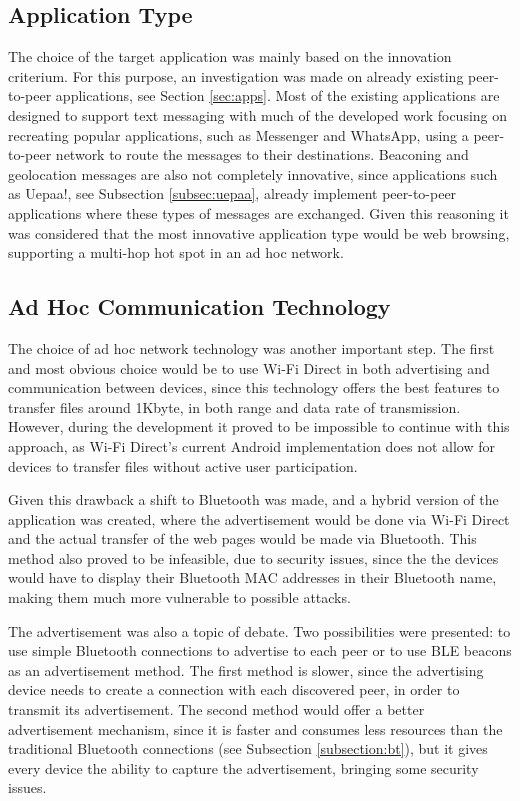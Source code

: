 \subsection{Application Type}

The choice of the target application was mainly based on the innovation criterium. For this purpose, an investigation was made on already existing peer-to-peer applications, see Section \ref{sec:apps}. Most of the existing applications are designed to support text messaging with much of the developed work focusing on recreating popular applications, such as Messenger and WhatsApp, using a peer-to-peer network to route the messages to their destinations. Beaconing and geolocation messages are also not completely innovative, since applications such as Uepaa!, see Subsection \ref{subsec:uepaa}, already implement peer-to-peer applications where these types of messages are exchanged. Given this reasoning it was considered that the most innovative application type would be web browsing, supporting a multi-hop hot spot in an ad hoc network.

\subsection{Ad Hoc Communication Technology}

The choice of ad hoc network technology was another important step. The first and most obvious choice would be to use Wi-Fi Direct in both advertising and communication between devices, since this technology offers the best features to transfer files around 1Kbyte, in both range and data rate of transmission. However, during the development it proved to be impossible to continue with this approach, as Wi-Fi Direct's current Android implementation does not allow for devices to transfer files without active user participation.

Given this drawback a shift to Bluetooth was made, and a hybrid version of the application was created, where the advertisement would be done via Wi-Fi Direct and the actual transfer of the web pages would be made via Bluetooth. This method also proved to be infeasible, due to security issues, since the the devices would have to display their Bluetooth MAC addresses in their Bluetooth name, making them much more vulnerable to possible attacks.

The advertisement was also a topic of debate. Two possibilities were presented: to use simple Bluetooth connections to advertise to each peer or to use \gls{BLE} beacons as an advertisement method. The first method is slower, since the advertising device needs to create a connection with each discovered peer, in order to transmit its advertisement. The second method would offer a better advertisement mechanism, since it is faster and consumes less resources than the traditional Bluetooth connections (see Subsection \ref{subsection:bt}), but it gives every device the ability to capture the advertisement, bringing some security issues.

